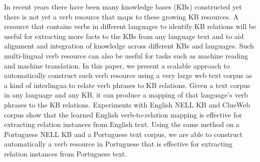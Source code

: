 In recent years there have been many knowledge bases (KBs) constructed yet there is not yet a verb resource that maps to these growing KB resources. A resource that contains verbs in different languages to identify KB relations will be useful for extracting more facts to the KBs from any language text and to aid alignment and integration of knowledge across different KBs and languages. Such multi-lingual verb resource can also be useful for tasks such as machine reading and machine translation. In this paper, we present a scalable approach to automatically construct such verb resource using a very large web text corpus as a kind of interlingua to relate verb phrases to KB relations. Given a text corpus in any language and any KB, it can produce a mapping of that language's verb phrases to the KB relations. Experiments with English NELL KB and ClueWeb corpus show that the learned English verb-to-relation mapping is effective for extracting relation instances from English text. Using the same method on a Portuguese NELL KB and a Portuguese text corpus, we are able to construct automatically a verb resource in Portuguese that is effective for extracting relation instances from Portuguese text.
